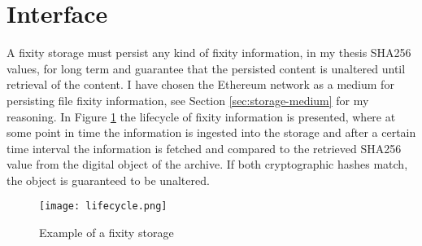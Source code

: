 \section{Interface}
A fixity storage must persist any kind of fixity information, in my thesis SHA256 values, for long term and guarantee that the persisted content is unaltered until retrieval of the content. I have chosen the Ethereum network as a medium for persisting file fixity information, see Section \ref{sec:storage-medium} for my reasoning. In Figure \ref{fig:lifecycle} the lifecycle of fixity information is presented, where at some point in time the information is ingested into the storage and after a certain time interval the information is fetched and compared to the retrieved SHA256 value from the digital object of the archive. If both cryptographic hashes match, the object is guaranteed to be unaltered. 
\begin{figure}[b]
  \caption{Example of a fixity storage}
  \label{fig:lifecycle}
  \centering
    \texttt{[image: lifecycle.png]}
\end{figure}
